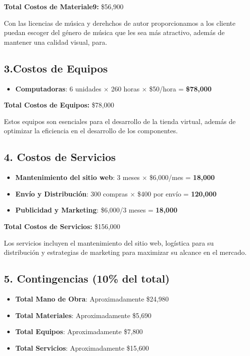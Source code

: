 \documentclass[12pt]{article}
\begin{document}
\textbf{Total Costos de Materiale9:} \$56,900

Con las licencias de música y derehchos de autor proporcionamos a los cliente puedan escoger del género de música que les sea más atractivo, además de mantener una calidad visual, para.

\subsection*{3.Costos de Equipos}
\begin{itemize}

    \item \textbf{Computadoras}: 6 unidades $\times$ 260 horas $\times$ \$50/hora = \textbf{\$78,000}
\end{itemize}

\textbf{Total Costos de Equipos:} \$78,000

Estos equipos son esenciales para el desarrollo de la tienda virtual, además de optimizar la eficiencia en el desarrollo de los componentes.

\subsection*{4. Costos de Servicios}
\begin{itemize}
    \item \textbf{Mantenimiento del sitio web}: 3 meses $\times$ \$6,000/mes = \textbf{18,000}
    \item \textbf{Envío y Distribución}: 300 compras $\times$ \$400 por envío = \textbf{120,000}
    \item \textbf{Publicidad y Marketing}: \$6,000/3 meses = \textbf{18,000}
\end{itemize}

\textbf{Total Costos de Servicios:} \$156,000

Los servicios incluyen el mantenimiento del sitio web, logística para su distribución y estrategias de marketing para maximizar su alcance en el mercado.

\subsection*{5. Contingencias (10\% del total)}
\begin{itemize}
    \item \textbf{Total Mano de Obra}: Aproximadamente \$24,980
    \item \textbf{Total Materiales}: Aproximadamente \$5,690
    \item \textbf{Total Equipos}: Aproximadamente \$7,800
    \item \textbf{Total Servicios}: Aproximadamente \$15,600
\end{itemize}
\end{document}
